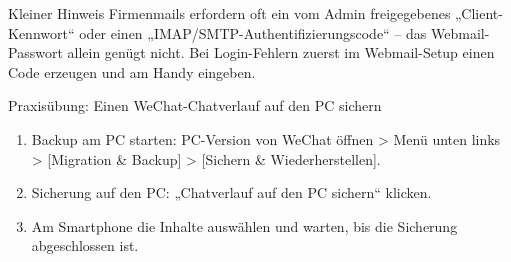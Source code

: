 \begin{tcbinfo}{Kleiner Hinweis}
Firmenmails erfordern oft ein vom Admin freigegebenes „Client-Kennwort“ oder einen „IMAP/SMTP-Authentifizierungscode“ – das Webmail-Passwort allein genügt nicht. Bei Login-Fehlern zuerst im Webmail-Setup einen Code erzeugen und am Handy eingeben.

\end{tcbinfo}

\begin{tcbpractice}{Praxisübung: Einen WeChat-Chatverlauf auf den PC sichern}
\begin{enumerate}
  \item Backup am PC starten: PC-Version von WeChat öffnen > Menü unten links > [Migration \& Backup] > [Sichern \& Wiederherstellen].
  \item Sicherung auf den PC: „Chatverlauf auf den PC sichern“ klicken.
  \item Am Smartphone die Inhalte auswählen und warten, bis die Sicherung abgeschlossen ist.
\end{enumerate}

\end{tcbpractice}
